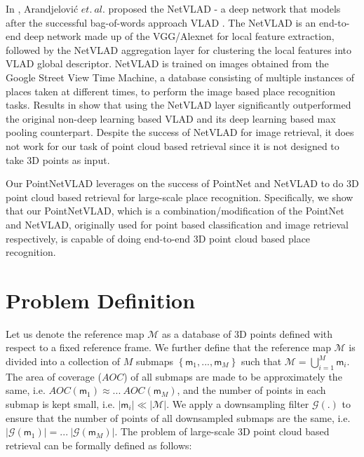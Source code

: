 \documentclass[10pt,twocolumn,letterpaper]{article}
\begin{document}
In \cite{Arandjelovic16}, Arandjelovi\'c $et.~al.$ proposed the NetVLAD - a deep network that models after the successful bag-of-words approach VLAD \cite{conf/cvpr/JegouDSP10, Arandjelovic:2013}. The NetVLAD is an end-to-end deep network made up of the VGG/Alexnet \cite{Simonyan:2016, Alex:2012} for local feature extraction, followed by the NetVLAD aggregation layer for clustering the local features into VLAD global descriptor. NetVLAD is trained on images obtained from the Google Street View Time Machine, a database consisting of multiple instances of places taken at different times, to perform the image based place recognition tasks. Results in \cite{Arandjelovic16} show that using the NetVLAD layer significantly outperformed the original non-deep learning based VLAD and its deep learning based max pooling counterpart. Despite the success of NetVLAD for image retrieval, it does not work for our task of point cloud based retrieval since it is not designed to take 3D points as input. 


Our PointNetVLAD leverages on the success of PointNet \cite{qi2016pointnet} and NetVLAD \cite{Arandjelovic16} to do 3D point cloud based retrieval for large-scale place recognition. Specifically, we show that our PointNetVLAD, which is a combination/modification of the PointNet and NetVLAD, originally used for point based classification and image retrieval respectively, is capable of doing end-to-end 3D point cloud based place recognition. 


 	\section{Problem Definition}

Let us denote the reference map $\mathcal{M}$ as a database of 3D points defined with respect to a fixed reference frame. 
We further define that the reference map $\mathcal{M}$ is divided into a collection of $M$ submaps $\left\lbrace \mathsf{m}_1, ..., \mathsf{m}_M  \right\rbrace$ such that $\mathcal{M} = \bigcup_{i=1}^{M} \mathsf{m}_i$. The area of coverage ($AOC$) of all submaps are made to be approximately the same, i.e. $AOC(\mathsf{m}_1) \approx ...~AOC(\mathsf{m}_M)$, and the number of points in each submap is kept small, i.e. $|\mathsf{m}_i| \ll |\mathcal{M}|$. 
We apply a downsampling filter $\mathcal{G}(.)$ to ensure that the number of points of all downsampled submaps are the same, i.e. $|\mathcal{G}(\mathsf{m}_1)| = ...~|\mathcal{G}(\mathsf{m}_M)|$.
The problem of large-scale 3D point cloud based retrieval can be formally defined as follows:
\end{document}

